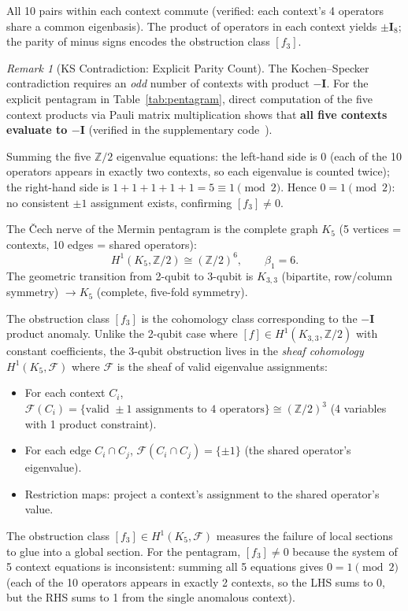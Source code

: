 \documentclass[11pt,a4paper]{article}
\theoremstyle{remark}
\newtheorem{remark}[theorem]{Remark}
\newcommand{\Z}{\mathbb{Z}}
\newcommand{\cF}{\mathcal{F}}
\begin{document}
All 10 pairs within each context commute (verified: each context's 4
operators share a common eigenbasis). The product of operators in each
context yields $\pm \mathbf{I}_8$; the parity of minus signs encodes the
obstruction class $[f_3]$.

\begin{remark}[KS Contradiction: Explicit Parity Count]
\label{rem:ks-parity}
The Kochen--Specker contradiction requires an \emph{odd} number of
contexts with product $-\mathbf{I}$. For the explicit pentagram in
Table~\ref{tab:pentagram}, direct computation of the five context
products via Pauli matrix multiplication shows that \textbf{all five
contexts evaluate to $-\mathbf{I}$} (verified in the supplementary
code~\cite{PaperXsuppl}).

Summing the five $\mathbb{Z}/2$ eigenvalue equations:
the left-hand side is $0$ (each of the 10 operators appears in exactly
two contexts, so each eigenvalue is counted twice);
the right-hand side is $1+1+1+1+1 = 5 \equiv 1 \pmod{2}$.
Hence $0 = 1 \pmod{2}$: no consistent $\pm 1$ assignment exists,
confirming $[f_3] \neq 0$.
\end{remark}

The \v{C}ech nerve of the Mermin pentagram is the complete graph $K_5$
(5 vertices = contexts, 10 edges = shared operators):
\[
H^1(K_5, \Z/2) \cong (\Z/2)^6, \qquad \beta_1 = 6.
\]
The geometric transition from 2-qubit to 3-qubit is $K_{3,3}$
(bipartite, row/column symmetry) $\to K_5$ (complete, five-fold
symmetry).

The obstruction class $[f_3]$ is the cohomology class corresponding to
the $-\mathbf{I}$ product anomaly. Unlike the 2-qubit case where
$[f] \in H^1(K_{3,3}, \Z/2)$ with constant coefficients, the 3-qubit
obstruction lives in the \emph{sheaf cohomology} $H^1(K_5, \cF)$ where
$\cF$ is the sheaf of valid eigenvalue assignments:

\begin{itemize}
  \item For each context $C_i$,
    $\cF(C_i) = \{ \text{valid } \pm 1 \text{ assignments to 4 operators} \}
    \cong (\Z/2)^3$ (4 variables with 1 product constraint).
  \item For each edge $C_i \cap C_j$, $\cF(C_i \cap C_j) = \{ \pm 1 \}$
    (the shared operator's eigenvalue).
  \item Restriction maps: project a context's assignment to the shared
    operator's value.
\end{itemize}

The obstruction class $[f_3] \in H^1(K_5, \cF)$ measures the failure of
local sections to glue into a global section. For the pentagram,
$[f_3] \neq 0$ because the system of 5 context equations is inconsistent:
summing all 5 equations gives $0 = 1 \pmod 2$ (each of the 10 operators
appears in exactly 2 contexts, so the LHS sums to 0, but the RHS sums
to 1 from the single anomalous context).
\end{document}
